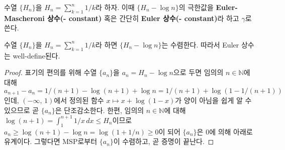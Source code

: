 \begin{definition}
    수열 $\{H_n\}$을 $H_n=\sum_{k=1}^n1/k$라 하자. 이때 $\{H_n-\log n\}$의 극한값을 \textbf{Euler-Mascheroni 상수(- constant)} 혹은 간단히 \textbf{Euler 상수(- constant)}라 하고 $\gamma$로 쓴다.
\end{definition}

\begin{proposition}\label{prop:eulerConstant}
    수열 $\{H_n\}$을 $H_n=\sum_{k=1}^n1/k$라 하면 $\{H_n-\log n\}$는 수렴한다. 따라서 Euler 상수는 well-define된다.
\end{proposition}

\begin{proof}
    표기의 편의를 위해 수열 $\{a_n\}$을 $a_n=H_n-\log n$으로 두면 임의의 $n\in\mathbb{N}$에 대해 $a_{n+1}-a_n=1/(n+1)-\log(n+1)+\log n=1/(n+1)+\log(1-1/(n+1))$인데, $(-\infty,\,1)$에서 정의된 함수 $x\mapsto x+\log(1-x)$가 양이 아님을 쉽게 알 수 있으므로 곧 $\{a_n\}$은 단조감소한다. 한편, 임의의 $n\in\mathbb{N}$에 대해 $\log(n+1)=\int_1^{n+1}1/x\,dx\leq H_n$이므로 $a_n\geq\log(n+1)-\log n=\log(1+1/n)\geq0$이 되어 $\{a_n\}$은 $0$에 의해 아래로 유계이다. 그렇다면 MSP로부터 $\{a_n\}$이 수렴하고, 곧 증명이 끝난다.
\end{proof}

